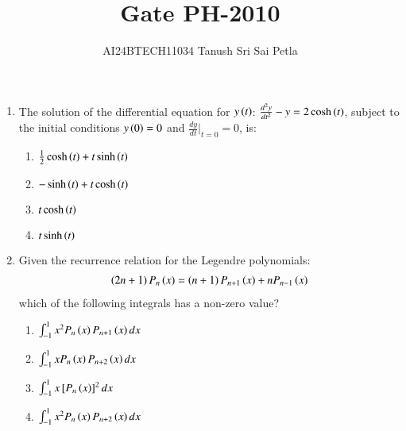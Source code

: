 \documentclass[journal]{IEEEtran}
\begin{document}

\vspace{3cm}


\renewcommand{\thefigure}{\theenumi}
\renewcommand{\thetable}{\theenumi}
\setlength{\intextsep}{10pt} %


\renewcommand{\thetable}{\theenumi}

\title{Gate PH-2010}
\author{AI24BTECH11034 Tanush Sri Sai Petla
}
\maketitle
\renewcommand{\thefigure}{\theenumi}
\renewcommand{\thetable}{\theenumi}
\begin{enumerate}
\item The solution of the differential equation for $y\left(t\right)$:  $\frac{d^2y}{dt^2} - y = 2 \cosh\left(t\right)$, subject to the initial conditions $y\left(0\right) = 0$ and $\frac{dy}{dt}|_{t=0} = 0$, is:
\begin{multicols}{2}
\begin{enumerate}
    \item $\frac{1}{2}\cosh\left(t\right) + t\sinh\left(t\right)$
    \item $-\sinh\left(t\right) + t\cosh\left(t\right)$
    \item $t\cosh\left(t\right)$
    \item $t\sinh\left(t\right)$
\end{enumerate}
\end{multicols}

\item Given the recurrence relation for the Legendre polynomials:
\begin{align*}
\left(2n+1\right)P_n\left(x\right) = \left(n+1\right)P_{n+1}\left(x\right) + nP_{n-1}\left(x\right)
\end{align*}
which of the following integrals has a non-zero value?
\begin{multicols}{2}
\begin{enumerate}
    \item $\int_{-1}^{1} x^2 P_n\left(x\right) P_{n+1}\left(x\right) dx$
    \item $\int_{-1}^{1} x P_n\left(x\right) P_{n+2}\left(x\right) dx$
    \item $\int_{-1}^{1} x {}\left[P_n\left(x\right)\right]^2 dx$
    \item $\int_{-1}^{1} x^2 P_n\left(x\right) P_{n+2}\left(x\right) dx$
\end{enumerate}
\end{multicols}


\end{enumerate}
\end{document}
